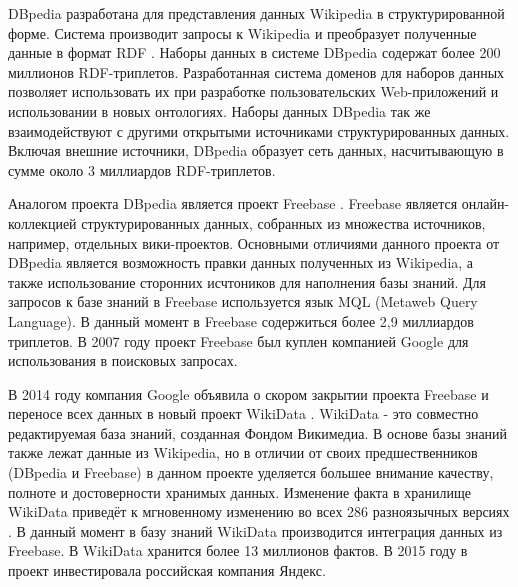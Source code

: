 DBpedia разработана для представления данных Wikipedia в структурированной форме. Система производит запросы к Wikipedia и преобразует полученные данные в формат RDF \cite{auer2007dbpedia}. Наборы данных в системе DBpedia содержат более 200 миллионов RDF-триплетов. Разработанная система доменов для наборов данных позволяет использовать их при разработке пользовательских Web-приложений и использовании в новых онтологиях. Наборы данных DBpedia так же взаимодействуют с другими открытыми источниками структурированных данных. Включая внешние источники, DBpedia образует сеть данных, насчитывающую в сумме около 3 миллиардов RDF-триплетов.  

Аналогом проекта DBpedia является проект Freebase \cite{bollacker2008freebase}. Freebase является онлайн-коллекцией структурированных данных, собранных из множества источников, например, отдельных вики-проектов. Основными отличиями данного проекта от DBpedia является возможность правки данных полученных из Wikipedia, а также использование сторонних исчтоников для наполнения базы знаний. Для запросов к базе знаний в Freebase используется язык MQL (Metaweb Query Language). В данный момент в Freebase содержиться более 2,9 миллиардов триплетов. В 2007 году проект Freebase был куплен компанией Google для использования в поисковых запросах.

В 2014 году компания Google объявила о скором закрытии проекта Freebase и переносе всех данных в новый проект WikiData \cite{vrandevcic2014wikidata}. WikiData - это совместно редактируемая база знаний, созданная Фондом Викимедиа. В основе базы знаний также лежат данные из Wikipedia, но в отличии от своих предшественников (DBpedia и Freebase) в данном проекте уделяется большее внимание качеству, полноте и достоверности хранимых данных. Изменение факта в хранилище WikiData приведёт к мгновенному изменению во всех 286 разноязычных версиях \cite{vrandecic2013rise}. В данный момент в базу знаний WikiData производится интеграция данных из Freebase. В WikiData хранится более 13 миллионов фактов. В 2015 году в проект инвестировала российская компания Яндекс.

